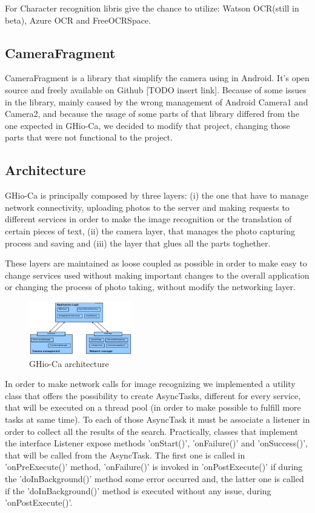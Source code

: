 For Character recognition libris give the chance to utilize: Watson OCR(still in 
beta), Azure OCR and FreeOCRSpace.

\subsection{CameraFragment}
CameraFragment is a library that simplify the camera using in Android. It's 
open source and freely available on Github [TODO insert link]. Because of some
issues in the library, mainly caused by the wrong management of Android Camera1 
and Camera2, and because the usage of some parts of that library differed from 
the one expected in GHio-Ca, we decided to modify that project, changing those 
parts that were not functional to the project.

\subsection{Architecture}
GHio-Ca is principally composed by three layers: (i) the one that have to manage
network connectivity, uploading photos to the server and making requests to 
different services in order to make the image recognition or the translation of 
certain pieces of text, (ii) the camera layer, that manages the photo 
capturing process and saving and (iii) the layer that glues all the parts 
toghether. 

These layers are maintained as loose coupled as possible in order to make 
easy to change services used without making important changes to the overall 
application or changing the process of photo taking, without modify the 
networking layer.

\begin{figure}[h]
    \centering
    \includegraphics[width=0.40\textwidth]{../img/ghioca_macro_component}
    \caption{GHio-Ca architecture}
    \label{fig:architecture}
\end{figure}

In order to make network calls for image recognizing we implemented a utility 
class that offers the possibility to create AsyncTasks, different for every 
service, that will be executed on a thread pool (in order to make possible to 
fulfill more tasks at same time). To each of those AsyncTask it must be associate 
a listener in order to collect all the results of the search. Practically, 
classes that implement the interface Listener expose methods 'onStart()', 
'onFailure()' and 'onSuccess()', that will be called from the AsyncTask. The 
first one is called in 'onPreExecute()' method, 'onFailure()' is invoked in 
'onPostExecute()' if during the 'doInBackground()' method some error occurred 
and, the latter one is called if the 'doInBackground()' method is executed 
without any issue, during 'onPostExecute()'.

